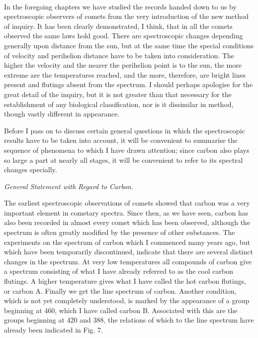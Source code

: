\documentclass[a4paper, 12pt, oneside, polutonikogreek, english]{article}
\begin{document}
\paragraph{}
In the foregoing chapters we have studied the records handed down to us by spectroscopic observers of comets from the very introduction of the new method of inquiry. It has been clearly demonstrated, I think, that in all the comets observed the same laws hold good. There are spectroscopic changes depending generally upon distance from the sun, but at the same time the special conditions of velocity and perihelion distance have to be taken into consideration. The higher the velocity and the nearer the perihelion point is to the sun, the more extreme are the temperatures reached, and the more, therefore, are bright lines present and flutings absent from the spectrum. I should perhaps apologise for the great detail of the inquiry, but it is not greater than that necessary for the establishment of any biological classification, nor is it dissimilar in method, though vastly different in appearance.

Before I pass on to discuss certain general questions in which the spectroscopic results have to be taken into account, it will be convenient to summarise the sequence of phenomena to which I have drawn attention; since carbon also plays so large a part at nearly all stages, it will be convenient to refer to its spectral changes specially.

\emph{General Statement with Regard to Carbon.}

The earliest spectroscopic observations of comets showed that carbon was a very important element in cometary spectra. Since then, as we have seen, carbon has also been recorded in almost every comet which has been observed, although the spectrum is often greatly modified by the presence of other substances. The experiments on the spectrum of carbon which I commenced many years ago, but which have been temporarily discontinued, indicate that there are several distinct changes in the spectrum. At very low temperatures all compounds of carbon give a spectrum consisting of what I have already referred to as the cool carbon flutings. A higher temperature gives what I have called the hot carbon flutings, or carbon A. Finally we get the line spectrum of carbon. Another condition, which is not yet completely understood, is marked by the appearance of a group beginning at 460, which I have called carbon B. Associated with this are the groups beginning at 420 and 388, the relations of which to the line spectrum have already been indicated in Fig. 7.
\end{document}
